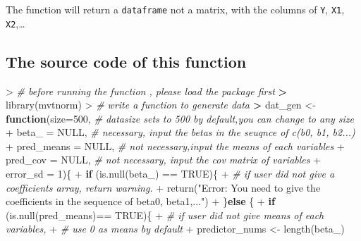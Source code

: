 \documentclass[
]{article}
\newenvironment{Shaded}{\begin{snugshade}}{\end{snugshade}}
\newcommand{\AttributeTok}[1]{\textcolor[rgb]{0.77,0.63,0.00}{#1}}
\newcommand{\CommentTok}[1]{\textcolor[rgb]{0.56,0.35,0.01}{\textit{#1}}}
\newcommand{\ConstantTok}[1]{\textcolor[rgb]{0.00,0.00,0.00}{#1}}
\newcommand{\ControlFlowTok}[1]{\textcolor[rgb]{0.13,0.29,0.53}{\textbf{#1}}}
\newcommand{\DecValTok}[1]{\textcolor[rgb]{0.00,0.00,0.81}{#1}}
\newcommand{\ErrorTok}[1]{\textcolor[rgb]{0.64,0.00,0.00}{\textbf{#1}}}
\newcommand{\FunctionTok}[1]{\textcolor[rgb]{0.00,0.00,0.00}{#1}}
\newcommand{\NormalTok}[1]{#1}
\newcommand{\OtherTok}[1]{\textcolor[rgb]{0.56,0.35,0.01}{#1}}
\newcommand{\SpecialCharTok}[1]{\textcolor[rgb]{0.00,0.00,0.00}{#1}}
\newcommand{\StringTok}[1]{\textcolor[rgb]{0.31,0.60,0.02}{#1}}
\begin{document}
The function will return a \texttt{dataframe} not a matrix, with the
columns of \texttt{Y}, \texttt{X1}, \texttt{X2},\ldots{}

\hypertarget{the-source-code-of-this-function}{%
\subsection{The source code of this
function}\label{the-source-code-of-this-function}}

\begin{Shaded}
\begin{Highlighting}[]
\SpecialCharTok{\textgreater{}} \CommentTok{\# before running the function , please load the package first}
\ErrorTok{\textgreater{}} \FunctionTok{library}\NormalTok{(mvtnorm)}
\SpecialCharTok{\textgreater{}} \CommentTok{\# write a function to generate data}
\ErrorTok{\textgreater{}}\NormalTok{ dat\_gen }\OtherTok{\textless{}{-}} \ControlFlowTok{function}\NormalTok{(}\AttributeTok{size=}\DecValTok{500}\NormalTok{, }\CommentTok{\# datasize sets to 500 by default,you can change to any size}
\SpecialCharTok{+}                     \AttributeTok{beta\_ =} \ConstantTok{NULL}\NormalTok{, }\CommentTok{\# necessary, input the betas in the seuqnce of c(b0, b1, b2...)}
\SpecialCharTok{+}                     \AttributeTok{pred\_means =} \ConstantTok{NULL}\NormalTok{, }\CommentTok{\# not necessary,input the means of each variables}
\SpecialCharTok{+}                     \AttributeTok{pred\_cov =} \ConstantTok{NULL}\NormalTok{, }\CommentTok{\# not necessary, input the cov matrix of variables}
\SpecialCharTok{+}                     \AttributeTok{error\_sd =} \DecValTok{1}\NormalTok{)\{}
\SpecialCharTok{+}   \ControlFlowTok{if}\NormalTok{ (}\FunctionTok{is.null}\NormalTok{(beta\_) }\SpecialCharTok{==} \ConstantTok{TRUE}\NormalTok{)\{}
\SpecialCharTok{+}     \CommentTok{\# if user did not give a coefficients array, return warning.}
\SpecialCharTok{+}     \FunctionTok{return}\NormalTok{(}\StringTok{"Error: You need to give the coefficients in the sequence of beta0, beta1,..."}\NormalTok{)}
\SpecialCharTok{+}\NormalTok{   \}}\ControlFlowTok{else}\NormalTok{ \{}
\SpecialCharTok{+}     \ControlFlowTok{if}\NormalTok{ (}\FunctionTok{is.null}\NormalTok{(pred\_means)}\SpecialCharTok{==} \ConstantTok{TRUE}\NormalTok{)\{}
\SpecialCharTok{+}       \CommentTok{\# if user did not give means of each variables,}
\SpecialCharTok{+}       \CommentTok{\# use 0 as means by default}
\SpecialCharTok{+}\NormalTok{       predictor\_nums }\OtherTok{\textless{}{-}} \FunctionTok{length}\NormalTok{(beta\_)}

\end{Highlighting}
\end{Shaded}
\end{document}
